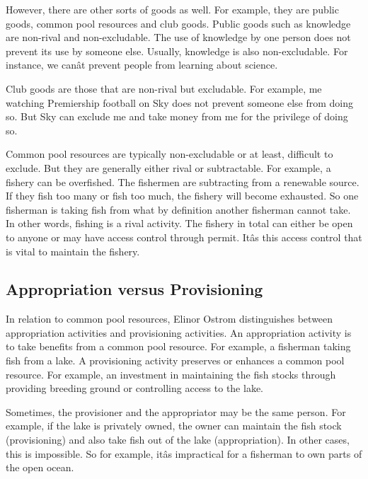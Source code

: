 \documentclass[]{tufte-handout}
\begin{document}
However, there are other sorts of goods as well. For example, they are
public goods, common pool resources and club goods. Public goods such as
knowledge are non-rival and non-excludable. The use of knowledge by one
person does not prevent its use by someone else. Usually, knowledge is
also non-excludable. For instance, we canât prevent people from
learning about science.

Club goods are those that are non-rival but excludable. For example, me
watching Premiership football on Sky does not prevent someone else from
doing so. But Sky can exclude me and take money from me for the
privilege of doing so.

Common pool resources are typically non-excludable or at least,
difficult to exclude. But they are generally either rival or
subtractable. For example, a fishery can be overfished. The fishermen
are subtracting from a renewable source. If they fish too many or fish
too much, the fishery will become exhausted. So one fisherman is taking
fish from what by definition another fisherman cannot take. In other
words, fishing is a rival activity. The fishery in total can either be
open to anyone or may have access control through permit. Itâs this
access control that is vital to maintain the fishery.

\hypertarget{appropriation-versus-provisioning}{%
\subsection{\texorpdfstring{\textbf{Appropriation versus
Provisioning}}{Appropriation versus Provisioning}}\label{appropriation-versus-provisioning}}

In relation to common pool resources, Elinor Ostrom distinguishes
between appropriation activities and provisioning activities. An
appropriation activity is to take benefits from a common pool resource.
For example, a fisherman taking fish from a lake. A provisioning
activity preserves or enhances a common pool resource. For example, an
investment in maintaining the fish stocks through providing breeding
ground or controlling access to the lake.

Sometimes, the provisioner and the appropriator may be the same person.
For example, if the lake is privately owned, the owner can maintain the
fish stock (provisioning) and also take fish out of the lake
(appropriation). In other cases, this is impossible. So for example,
itâs impractical for a fisherman to own parts of the open ocean.
\end{document}
